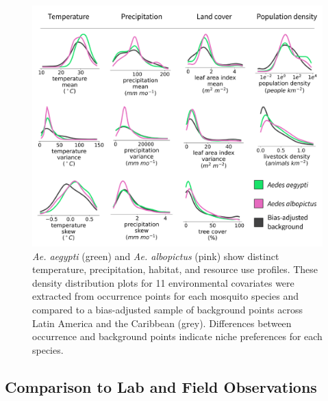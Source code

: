 \begin{figure}[!ht]
\includegraphics[width=\textwidth]{figures/ch3-density-plots.pdf}
\centering
\caption[Density distribution plots for 11 environmental covariates were extracted from occurrence points for each mosquito species and compared to a bias-adjusted sample of background points across Latin America and the Caribbean.]{\textit{Ae. aegypti} (green) and \textit{Ae. albopictus} (pink) show distinct temperature, precipitation, habitat, and resource use profiles. These density distribution plots for 11 environmental covariates were extracted from occurrence points for each mosquito species and compared to a bias-adjusted sample of background points across Latin America and the Caribbean (grey). Differences between occurrence and background points indicate niche preferences for each species.}
\label{fig:density-plots}
\end{figure}

\subsection{Comparison to Lab and Field Observations}

